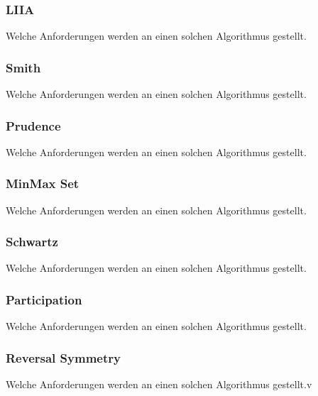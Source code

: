 \subsubsection{LIIA} 
\label{sec:anforderungen}
Welche Anforderungen werden an einen solchen Algorithmus gestellt.

\subsubsection{Smith} 
\label{sec:anforderungen}
Welche Anforderungen werden an einen solchen Algorithmus gestellt.

\subsubsection{Prudence} 
\label{sec:anforderungen}
Welche Anforderungen werden an einen solchen Algorithmus gestellt.

\subsubsection{MinMax Set} 
\label{sec:anforderungen}
Welche Anforderungen werden an einen solchen Algorithmus gestellt.

\subsubsection{Schwartz} 
\label{sec:anforderungen}
Welche Anforderungen werden an einen solchen Algorithmus gestellt.

\subsubsection{Participation} 
\label{sec:anforderungen}
Welche Anforderungen werden an einen solchen Algorithmus gestellt.

\subsubsection{Reversal Symmetry} 
\label{sec:anforderungen}
Welche Anforderungen werden an einen solchen Algorithmus gestellt.v




